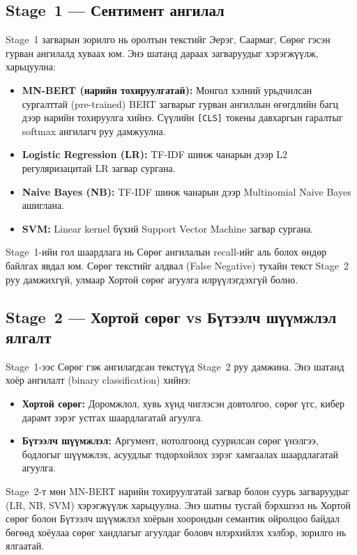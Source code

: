 \subsection{Stage~1 --- Сентимент ангилал}

Stage~1 загварын зорилго нь оролтын текстийг Эерэг, Саармаг, Сөрөг гэсэн
гурван ангилалд хуваах юм. Энэ шатанд дараах загваруудыг хэрэгжүүлж,
харьцуулна:

\begin{itemize}
  \item \textbf{MN-BERT (нарийн тохируулгатай):} Монгол хэлний урьдчилсан сургалттай
        (pre-trained) BERT загварыг гурван ангиллын өгөгдлийн багц дээр нарийн тохируулга
        хийнэ. Сүүлийн \texttt{[CLS]} токены давхаргын гаралтыг softmax
        ангилагч руу дамжуулна.
  \item \textbf{Logistic Regression (LR):} TF-IDF шинж чанарын дээр L2
        регуляризацитай LR загвар сургана.
  \item \textbf{Naive Bayes (NB):} TF-IDF шинж чанарын дээр Multinomial
        Naive Bayes ашиглана.
  \item \textbf{SVM:} Linear kernel бүхий Support Vector Machine загвар
        сургана.
\end{itemize}

Stage~1-ийн гол шаардлага нь Сөрөг ангилалын recall-ийг аль болох
өндөр байлгах явдал юм. Сөрөг текстийг алдвал (False Negative)
тухайн текст Stage~2 руу дамжихгүй, улмаар Хортой сөрөг агуулга илрүүлэгдэхгүй болно.

\subsection{Stage~2 --- Хортой сөрөг vs Бүтээлч шүүмжлэл ялгалт}

Stage~1-ээс Сөрөг гэж ангилагдсан текстүүд Stage~2 руу дамжина. Энэ шатанд
хоёр ангилалт (binary classification) хийнэ:

\begin{itemize}
  \item \textbf{Хортой сөрөг:} Доромжлол, хувь хүнд чиглэсэн довтолгоо, сөрөг
        үгс, кибер дарамт зэрэг устгах шаардлагатай агуулга.
  \item \textbf{Бүтээлч шүүмжлэл:} Аргумент, нотолгоонд суурилсан сөрөг
        үнэлгээ, бодлогыг шүүмжлэх, асуудлыг тодорхойлох зэрэг хамгаалах
        шаардлагатай агуулга.
\end{itemize}

Stage~2-т мөн MN-BERT нарийн тохируулгатай загвар болон суурь загваруудыг (LR, NB, SVM)
хэрэгжүүлж харьцуулна. Энэ шатны тусгай бэрхшээл нь Хортой сөрөг болон Бүтээлч шүүмжлэл
хоёрын хоорондын семантик ойролцоо байдал бөгөөд хоёулаа сөрөг хандлагыг
агуулдаг боловч илэрхийлэх хэлбэр, зорилго нь ялгаатай.

